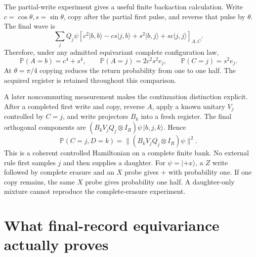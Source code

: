 \documentclass[11pt,oneside,openany]{book}
\theoremstyle{definition}
\theoremstyle{remark}\newtheorem{remark}[theorem]{Remark}
\begin{document}
The partial-write experiment gives a useful finite backaction calculation.
Write $c=\cos\theta,s=\sin\theta$, copy after the partial first pulse, and
reverse that pulse by $\theta$. The final wave is
\begin{equation}
 \sum_jQ_j\psi\left[
 c^2|b,b\rangle-cs|j,b\rangle
 +s^2|b,j\rangle+sc|j,j\rangle\right]_{A,C}.
 \label{cfg:partialecho}
\end{equation}
Therefore, under any admitted equivariant complete configuration law,
\[
 \mathbb P(A=b)=c^4+s^4,\qquad
 \mathbb P(A=j)=2c^2s^2e_j,\qquad
 \mathbb P(C=j)=s^2e_j.
\]
At $\theta=\pi/4$ copying reduces the return probability from one to
one half. The acquired register is retained throughout this comparison.

A later noncommuting measurement makes the continuation distinction explicit.
After a completed first write and copy, reverse $A$, apply a known unitary
$V_j$ controlled by $C=j$, and write projectors $B_k$ into a fresh register.
The final orthogonal components are
$(B_kV_jQ_j\otimes I_R)\psi\,|b,j,k\rangle$. Hence
\begin{equation}
 \mathbb P(C=j,D=k)=\|(B_kV_jQ_j\otimes I_R)\psi\|^2.
 \label{cfg:sequential}
\end{equation}
This is a coherent controlled Hamiltonian on a complete finite bank.
No external rule first samples $j$ and then supplies a daughter.
For $\psi=|+x\rangle$, a $Z$ write followed by complete erasure and an $X$
probe gives $+$ with probability one. If one copy remains, the same $X$
probe gives probability one half. A daughter-only mixture cannot reproduce
the complete-erasure experiment.

\section{What final-record equivariance actually proves}
\end{document}
